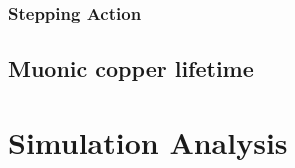 \subsection{Stepping Action} %
\label{sub:stepping_action}

\section{Muonic copper lifetime} %
\label{sec:muonic_copper_lifetime}

\chapter{Simulation Analysis} %
\label{cha:simulation_analysis}

